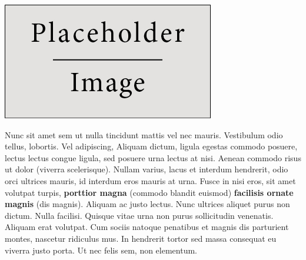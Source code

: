 \documentclass[a0paper,portrait]{baposter}
\begin{document}
\begin{poster}
{%

\begin{center}
\includegraphics[width=0.8\linewidth]{placeholder}
\end{center}


Nunc sit amet sem ut nulla tincidunt mattis vel nec mauris. Vestibulum odio tellus, lobortis. Vel adipiscing, Aliquam dictum, ligula egestas commodo posuere, lectus lectus congue ligula, sed posuere urna lectus at nisi. Aenean commodo risus ut dolor (viverra scelerisque). Nullam varius, lacus et interdum hendrerit, odio orci ultrices mauris, id interdum eros mauris at urna. Fusce in nisi eros, sit amet volutpat turpis, \textbf{porttior magna} (commodo blandit euismod) \textbf{facilisis ornate magnis} (dis magnis). Aliquam ac justo lectus. Nunc ultrices aliquet purus non dictum. Nulla facilisi. Quisque vitae urna non purus sollicitudin venenatis. Aliquam erat volutpat. Cum sociis natoque penatibus et magnis dis parturient montes, nascetur ridiculus mus. In hendrerit tortor sed massa consequat eu viverra justo porta. Ut nec felis sem, non elementum.
}


\end{poster}
\end{document}
